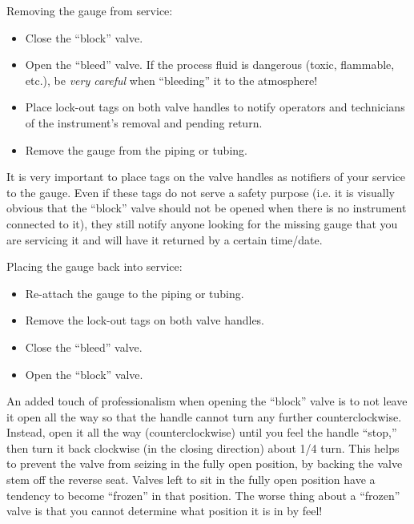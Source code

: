 





Removing the gauge from service:

\begin{itemize}
\item{} Close the ``block'' valve.
\item{} Open the ``bleed'' valve.  If the process fluid is dangerous (toxic, flammable, etc.), be {\it very careful} when ``bleeding'' it to the atmosphere!
\item{} Place lock-out tags on both valve handles to notify operators and technicians of the instrument's removal and pending return.
\item{} Remove the gauge from the piping or tubing.
\end{itemize}

It is very important to place tags on the valve handles as notifiers of your service to the gauge.  Even if these tags do not serve a safety purpose (i.e. it is visually obvious that the ``block'' valve should not be opened when there is no instrument connected to it), they still notify anyone looking for the missing gauge that you are servicing it and will have it returned by a certain time/date.

\vskip 10pt

Placing the gauge back into service:

\begin{itemize}
\item{} Re-attach the gauge to the piping or tubing.
\item{} Remove the lock-out tags on both valve handles.
\item{} Close the ``bleed'' valve.
\item{} Open the ``block'' valve.
\end{itemize}

An added touch of professionalism when opening the ``block'' valve is to not leave it open all the way so that the handle cannot turn any further counterclockwise.  Instead, open it all the way (counterclockwise) until you feel the handle ``stop,'' then turn it back clockwise (in the closing direction) about 1/4 turn.  This helps to prevent the valve from seizing in the fully open position, by backing the valve stem off the reverse seat.  Valves left to sit in the fully open position have a tendency to become ``frozen'' in that position.  The worse thing about a ``frozen'' valve is that you cannot determine what position it is in by feel!

